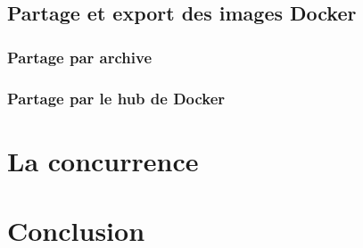 \documentclass{beamer}
\begin{document}
    \subsection{Partage et export des images Docker}
    \begin{frame}
       \begin{itemize}
       \end{itemize}
    \end{frame}

    \subsubsection{Partage par archive}
    \begin{frame}
    \end{frame}

    \subsubsection{Partage par le hub de Docker}
    \begin{frame}
    \end{frame}


    \section{La concurrence}
    \begin{frame}
    \end{frame}


    \section{Conclusion}
    \begin{frame}
    \end{frame}
\end{document}
